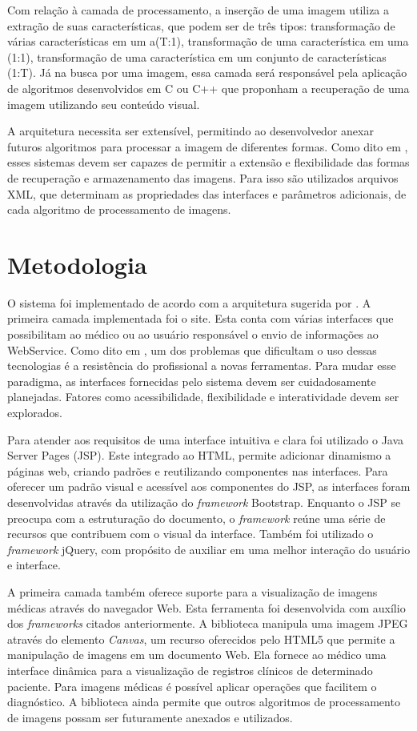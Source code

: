 Com relação à camada de processamento, a inserção de uma imagem utiliza a extração de suas características, que podem ser de três tipos: transformação de várias características em um a(T:1), transformação de uma característica em uma (1:1), transformação de uma característica em um conjunto de características (1:T)\cite{REF10}.
Já na busca por uma imagem, essa camada será responsável pela aplicação de algoritmos desenvolvidos em C ou C++ que proponham a recuperação de uma imagem utilizando seu conteúdo visual.

A arquitetura necessita ser extensível, permitindo ao desenvolvedor anexar futuros algoritmos para processar a imagem de diferentes formas.
Como dito em \cite{REF18}, esses sistemas devem ser capazes de permitir a extensão e flexibilidade das formas de recuperação e armazenamento das imagens.
Para isso são utilizados arquivos XML, que determinam as propriedades das interfaces e parâmetros adicionais, de cada algoritmo de processamento de imagens.

\section{\esp Metodologia}


O sistema foi implementado de acordo com a arquitetura sugerida por \cite{REF10}.
A primeira camada implementada foi o site. Esta conta com várias interfaces que possibilitam ao médico ou ao usuário responsável o envio de informações ao WebService.
Como dito em \cite{REF09}, um dos problemas que dificultam o uso dessas tecnologias é a resistência do profissional a novas ferramentas.
Para mudar esse paradigma, as interfaces fornecidas pelo sistema devem ser cuidadosamente planejadas.
Fatores como acessibilidade, flexibilidade e interatividade devem ser explorados.

Para atender aos requisitos de uma interface intuitiva e clara foi utilizado o Java Server Pages (JSP).
Este integrado ao HTML, permite adicionar dinamismo a páginas web, criando padrões e reutilizando componentes nas interfaces.
Para oferecer um padrão visual e acessível aos componentes do JSP, as interfaces foram desenvolvidas através da utilização do \textit{framework} Bootstrap.
Enquanto o JSP se preocupa com a estruturação do  documento, o \textit{framework} reúne uma série de recursos que contribuem com o visual da interface. Também foi utilizado o \textit{framework} jQuery, com propósito de auxiliar em uma melhor interação do usuário e interface.

A primeira camada também oferece suporte para a visualização de imagens médicas através do navegador Web. Esta ferramenta foi desenvolvida com auxílio dos \textit{frameworks} citados anteriormente. A biblioteca manipula uma imagem JPEG através do elemento \textit{Canvas}, um recurso oferecidos pelo HTML5 que permite a manipulação de imagens em um documento Web. Ela fornece ao médico uma interface dinâmica para a visualização de registros clínicos de determinado paciente. Para imagens médicas é possível aplicar operações que facilitem o diagnóstico. A biblioteca ainda permite que outros algoritmos de processamento de imagens possam ser futuramente anexados e utilizados.

